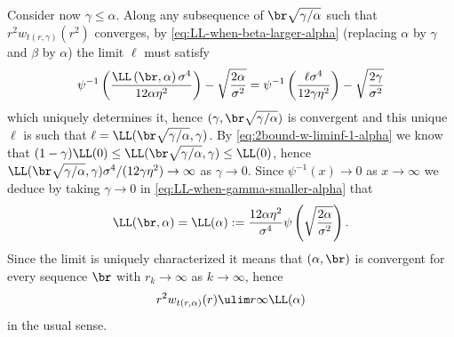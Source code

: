 \documentclass[10pt,a4paper]{article}
\begin{document}
Consider now $\gamma\leq \alpha$. %
Along any subsequence of $\br \sqrt{\gamma/\alpha}$ such that $r^2 w_{t(r,\gamma)}(r^2)$ converges, by \eqref{eq:LL-when-beta-larger-alpha} (replacing $\alpha$ by $\gamma$ and $\beta$ by $\alpha$) the limit $\ell$ must satisfy 
\begin{equation}\label{eq:LL-when-gamma-smaller-alpha}
\psi^{-1}\left( \frac{\LL\left(\br, \alpha\right) \sigma^4}{12\alpha\eta^2} \right) - \sqrt{\frac{2\alpha}{\sigma^2}} = \psi^{-1}\left( \frac{\ell \sigma^4}{12\gamma\eta^2} \right) - \sqrt{\frac{2\gamma}{\sigma^2}} 
\end{equation}
which uniquely determines it, hence $(\gamma, \br\sqrt{\gamma/\alpha})$ is convergent and  this unique $\ell$ is such that $\ell = \LL(\br\sqrt{\gamma/\alpha}, \gamma)$. By \eqref{eq:2bound-w-liminf-1-alpha} we know that $(1-\gamma)\LL(0) \leq \LL(\br\sqrt{\gamma/\alpha}, \gamma) \leq \LL(0)$, hence $\LL(\br\sqrt{\gamma/\alpha},\gamma)\sigma^4 / (12\gamma \eta^2) \to \infty$ as $\gamma\to 0$. Since $\psi^{-1}(x) \to 0$ as $x\to\infty$ we deduce by taking $\gamma \to 0$ in \eqref{eq:LL-when-gamma-smaller-alpha} that
\begin{equation*}%
\LL(\br, \alpha) = \LL(\alpha) := \frac{12 \alpha \eta^2}{\sigma^4} \psi\left( \sqrt{\frac{2\alpha}{\sigma^2}} \right) .
\end{equation*}
Since the limit is uniquely characterized it means that $(\alpha, \br)$ is convergent for every sequence $\br$ with $r_k\to\infty$ as $k\to\infty$, hence 
\[ r^2 w_{t(r,\alpha)}(r) \ulim r \infty \LL(\alpha) \]
in the usual sense. 
\end{document}
